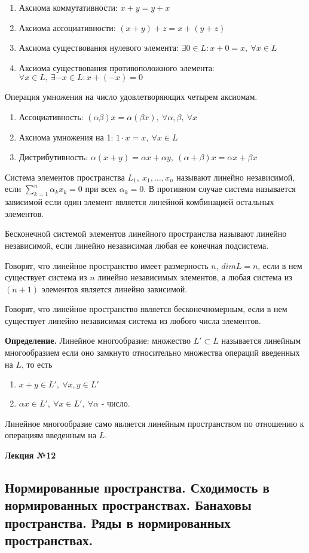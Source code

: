\documentclass[14pt,a4paper]{extarticle}
\theoremstyle{definition}
\theoremstyle{remark}
\renewcommand{\[}{\begin{dmath*}[compact]}
\renewcommand{\]}{\end{dmath*}}
\newcommand{\be}{\begin{enumerate}}
\newcommand{\ee}{\end{enumerate}}
\newcommand{\sep}{ , \ \allowbreak }
\newcommand{\tdef}{\textbf{Определение.} }
\begin{document}
\be
  \item Аксиома коммутативности: $x+y = y+x$
  \item Аксиома ассоциативности: $(x+y)+z = x+(y+z)$
  \item Аксиома существования нулевого элемента: $\exists 0 \in L: x+0=x \sep \forall x \in L$
  \item Аксиома существования противоположного элемента: $\forall x \in L \sep \exists -x \in L: x+(-x)=0$
\ee

Операция умножения на число удовлетворяющих четырем аксиомам.
\be
  \item Ассоциативность: $(\alpha \beta) x = \alpha (\beta x) \sep \forall \alpha, \beta \sep \forall x$
  \item Аксиома умножения на 1: $1\cdot x = x \sep \forall x \in L$
  \item Дистрибутивность: $\alpha (x+y)=\alpha x + \alpha y \sep (\alpha+\beta)x=\alpha x + \beta x$
\ee

Система элементов пространства $L_1 \sep x_1, \dots, x_n$ называют линейно независимой, если $\sum_{k=1}^n \alpha_k x_k = 0$ при всех $\alpha_k = 0$. В противном случае система называется зависимой если один элемент является линейной комбинацией остальных элементов.

Бесконечной системой элементов линейного пространства называют линейно независимой, если линейно независимая любая ее конечная подсистема.

Говорят, что линейное пространство имеет размерность $n$, $dim L=n$, если в нем существует система из $n$ линейно независимых элементов, а любая система из $(n+1)$ элементов является линейно зависимой.

Говорят, что линейное пространство является бесконечномерным, если в нем существует линейно независимая система из любого числа элементов.

\tdef Линейное многообразие: множество $L'\subset L$ называется линейным многообразием если оно замкнуто относительно множества операций введенных на $L$, то есть
\be
  \item $x+y \in L' \sep \forall x,y \in L'$
  \item $\alpha x \in L' \sep \forall x \in L' \sep \forall \alpha$ - число.
\ee

Линейное многообразие само является линейным пространством по отношению к операциям введенным на $L$.

\textbf{Лекция №12}

\subsection{Нормированные пространства.
Сходимость в нормированных пространствах.
Банаховы пространства. Ряды в нормированных пространствах.}
\end{document}
